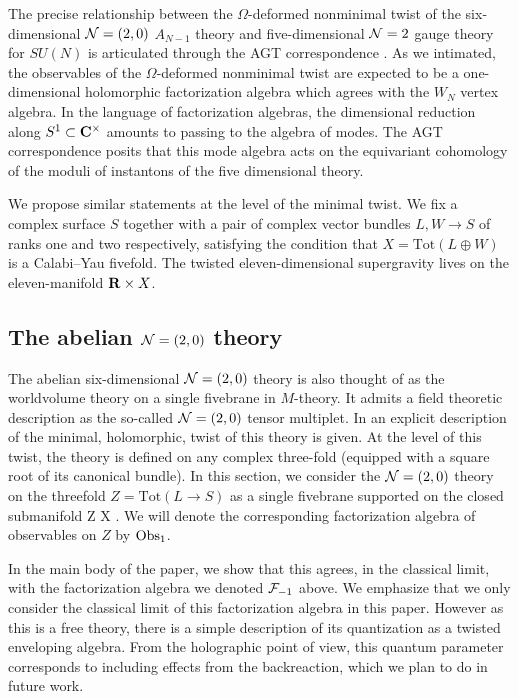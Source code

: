 The precise relationship between the $\Omega$-deformed nonminimal twist of the six-dimensional $\mathcal N=(2,0)$ $A_{N-1}$ theory and five-dimensional $\mathcal N=2$ gauge theory for $SU(N)$ is articulated through the AGT correspondence \cite{AGT}. As we intimated, the observables of the $\Omega$-deformed nonminimal twist are expected to be a one-dimensional holomorphic factorization algebra which agrees with the $W_{N}$ vertex algebra. In the language of factorization algebras, the dimensional reduction along $S^{1}\subset \mathbf{C}^{\times}$ amounts to passing to the algebra of modes. The AGT correspondence posits that this mode algebra acts on the equivariant cohomology of the moduli of instantons of the five dimensional theory.

We propose similar statements at the level of the minimal twist. 
We fix a complex surface $S$ together with a pair of complex vector bundles $L,W \to S$ of ranks one and two respectively, satisfying the condition that $X = \text{Tot} (L \oplus W)$ is a Calabi--Yau fivefold.
The twisted eleven-dimensional supergravity lives on the eleven-manifold $\mathbf{R} \times X$. 

\subsection*{The abelian $\mathcal N=(2,0)$ theory}

The abelian six-dimensional $\mathcal N=(2,0)$ theory is also thought of as the worldvolume theory on a single fivebrane in $M$-theory. 
It admits a field theoretic description as the so-called $\mathcal N=(2,0)$ tensor multiplet. 
In \cite{SWtensor} an explicit description of the minimal, holomorphic, twist of this theory is given.
At the level of this twist, the theory is defined on any complex three-fold (equipped with a square root of its canonical bundle). 
In this section, we consider the $\mathcal N=(2,0)$ theory on the threefold $Z = \text{Tot}(L \to S)$ as a single fivebrane supported on the closed submanifold
\beqn
Z \hookrightarrow \R \times X .
\eeqn
We will denote the corresponding factorization algebra of observables on $Z$ by $\operatorname{Obs}_1$.

In the main body of the paper, we show that this agrees, in the classical limit, with the factorization algebra we denoted $\mathcal F_{-1}$ above. 
We emphasize that we only consider the classical limit of this factorization algebra in this paper. 
However as this is a free theory, there is a simple description of its quantization as a twisted enveloping algebra.
From the holographic point of view, this quantum parameter corresponds to including effects from the backreaction, which we plan to do in future work.


